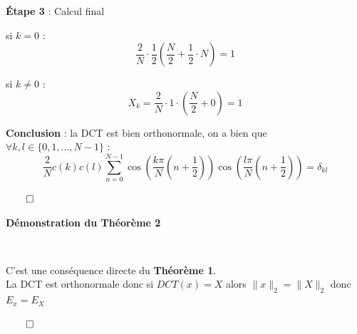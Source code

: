 \documentclass{article}
\newenvironment{myproof}[1][\proofname]{%
  \begin{proofbox}%
}{\hfill$\qed$\end{proofbox}}
\begin{document}
\begin{myproof}
    
    \textbf{Étape 3} : Calcul final
    
    si $k = 0$ : $$ \frac{2}{N} \cdot \frac{1}{2} \left(\frac{N}{2} + \frac{1}{2} \cdot N \right) = 1 $$
    
    si $k \neq 0$ : $$ X_k = \dfrac{2}{N} \cdot 1 \cdot \left(\frac{N}{2} + 0 \right) = 1 $$

    \vspace{.7cm}
    
    \textbf{Conclusion} : la DCT est bien orthonormale, on a bien que $\forall k, l \in \{0, 1, ..., N-1\}$ :
    $$\boxed{
    \dfrac{2}{N} c(k)c(l)\sum_{n=0}^{N-1} \cos \left( \frac{k\pi}{N} \left( n + \frac{1}{2} \right) \right)\cos \left( \frac{l\pi}{N} \left( n + \frac{1}{2} \right) \right) = \delta_{kl}
    }$$

\end{myproof}

\begin{myproof}
    \textbf{Démonstration du Théorème 2}

    \ \ 

    C'est une conséquence directe du \textbf{Théorème 1}.
    \\ 
    
    La DCT est orthonormale donc si $DCT(x) = X$ alors $\|x\|_2 = \|X\|_2 $ donc $E_x = E_X$ 
    
    

\end{myproof}
\end{document}

